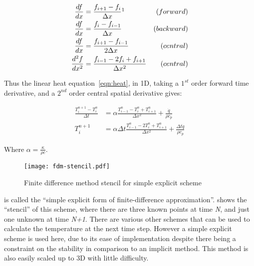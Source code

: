 
\begin{subequations}
\begin{align}
\frac{df}{dx} &= \frac{f_{i+1} - f_{i}}{\Delta x}\footnotemark  &(forward) \label{eqn:fdmfwd}\\
\frac{df}{dx} &= \frac{f_{i} - f_{i-1}}{\Delta x}  &(backward) \label{eqn:fdmbck}\\
\frac{df}{dx} &= \frac{f_{i+1} - f_{i-1}}{2\Delta x}  &(central)\label{eqn:fdmcent}\\
\frac{d^2f}{dx^2} &= \frac{f_{i-1}-2f_i+f_{i+1}}{\Delta x^2} &(central)\label{eqn:fdmcent2}
\end{align}
\end{subequations}

Thus the linear heat equation~\cref{eqn:heat}, in 1D, taking a $1^{st}$ order forward time derivative, and a $2^{nd}$ order central spatial derivative gives:

\begin{subequations}
\begin{align}
\frac{T^{n+1}_i-T^{n}_i}{\Delta t} &= \alpha\frac{T^n_{i-1}-T^n_{i}+T^n_{i+1}}{\Delta x^2}  + \frac{\dot{q}}{\rho c_p}\\
T_{i}^{n+1} &=  \alpha\Delta t \frac{T_{i-1}^n-2T_i^n+T_{i+1}^n}{\Delta x^2} + \frac{\Delta t\dot{q}}{\rho c_p}
\label{eqn:simplefdm}
\end{align}
\end{subequations}

Where $\alpha=\tfrac{\kappa}{\rho c}$.

\begin{figure}
  \begin{center}
    \texttt{[image: fdm-stencil.pdf]}
  \end{center}
  \caption{Finite difference method stencil for simple explicit scheme}\label{fig:fdmstencil}
\end{figure}

 is called the ``simple explicit form of finite-difference approximation''\cite{ozisik1994finite}.  shows the ``stencil'' of this scheme, where there are three known points at time \textit{N}, and just one unknown at time \textit{N+1}. There are various other schemes that can be used to calculate the temperature at the next time step. However a simple explicit scheme is used here, due to its ease of implementation despite there being a constraint on the stability in comparison to an implicit method. This method is also easily scaled up to 3D with little difficulty.

